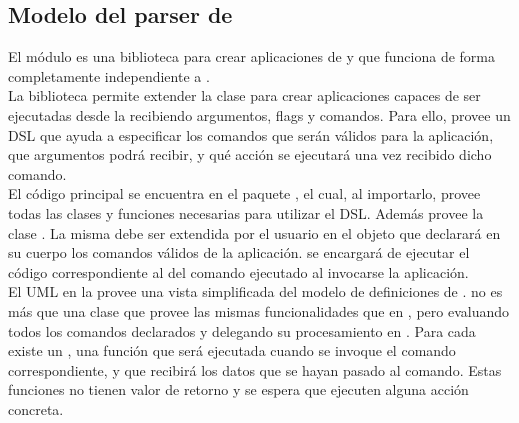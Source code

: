\subsection{Modelo del parser de \cli}

El módulo \scaliapp es una biblioteca para crear aplicaciones de \cli y que 
funciona de forma completamente independiente a \fronttier.\\
La biblioteca permite extender la clase  para crear aplicaciones 
capaces de ser ejecutadas desde la \cli recibiendo argumentos, flags y 
comandos. Para ello, \scaliapp provee un DSL que ayuda a especificar los 
comandos que serán válidos para la aplicación, que argumentos podrá recibir, y 
qué acción se ejecutará una vez recibido dicho comando.\\
El código principal se encuentra en el paquete , 
el cual, al importarlo, provee todas las clases y funciones necesarias para 
utilizar el DSL. Además provee la clase . La misma debe ser 
extendida por el usuario en el objeto que declarará en su cuerpo los comandos 
válidos de la aplicación.  se encargará de ejecutar el código 
correspondiente al  del comando ejecutado al invocarse la 
aplicación.\\
El UML en la  provee una vista simplificada del 
modelo de definiciones de \scaliapp.  no es más que una clase que 
provee las mismas funcionalidades que  en \scala, pero evaluando 
todos los comandos declarados y delegando su procesamiento en 
. Para cada  existe un 
, una función que será ejecutada cuando se invoque el comando 
correspondiente, y que recibirá los datos que se hayan pasado al comando. Estas 
funciones no tienen valor de retorno y se espera que ejecuten alguna acción 
concreta.\\

